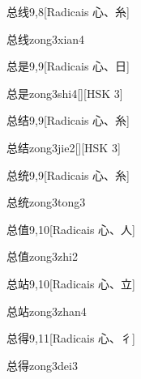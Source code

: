 \begin{entry}{总线}{9,8}[Radicais ⼼、⽷]
  \begin{phonetics}{总线}{zong3xian4}
  \end{phonetics}
\end{entry}

\begin{entry}{总是}{9,9}[Radicais ⼼、⽇]
  \begin{phonetics}{总是}{zong3shi4}[][HSK 3]
  \end{phonetics}
\end{entry}

\begin{entry}{总结}{9,9}[Radicais ⼼、⽷]
  \begin{phonetics}{总结}{zong3jie2}[][HSK 3]
  \end{phonetics}
\end{entry}

\begin{entry}{总统}{9,9}[Radicais ⼼、⽷]
  \begin{phonetics}{总统}{zong3tong3}
  \end{phonetics}
\end{entry}

\begin{entry}{总值}{9,10}[Radicais ⼼、⼈]
  \begin{phonetics}{总值}{zong3zhi2}
  \end{phonetics}
\end{entry}

\begin{entry}{总站}{9,10}[Radicais ⼼、⽴]
  \begin{phonetics}{总站}{zong3zhan4}
  \end{phonetics}
\end{entry}

\begin{entry}{总得}{9,11}[Radicais ⼼、⼻]
  \begin{phonetics}{总得}{zong3dei3}
  \end{phonetics}
\end{entry}

